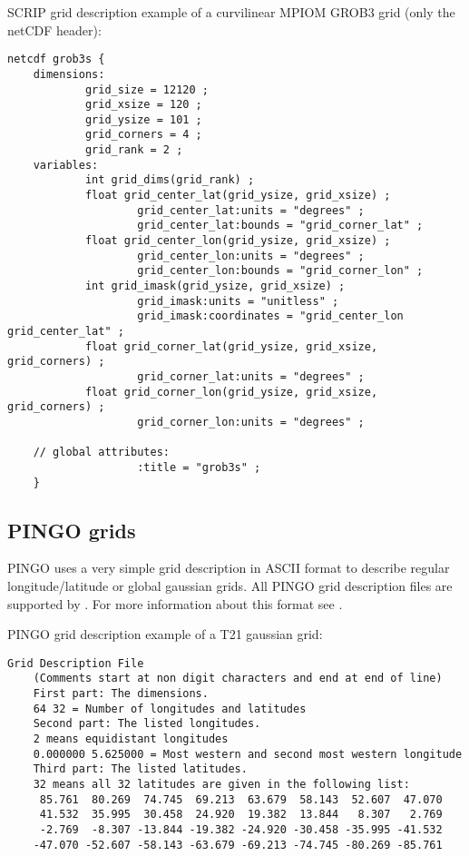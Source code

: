 SCRIP grid description example of a curvilinear MPIOM \cite{MPIOM} GROB3 grid (only the netCDF header):
\begin{lstlisting}[frame=single, backgroundcolor=\color{zebg}, basicstyle=\footnotesize]
    netcdf grob3s {
    dimensions:
            grid_size = 12120 ;
            grid_xsize = 120 ;
            grid_ysize = 101 ;
            grid_corners = 4 ;
            grid_rank = 2 ;
    variables:
            int grid_dims(grid_rank) ;
            float grid_center_lat(grid_ysize, grid_xsize) ;
                    grid_center_lat:units = "degrees" ;
                    grid_center_lat:bounds = "grid_corner_lat" ;
            float grid_center_lon(grid_ysize, grid_xsize) ;
                    grid_center_lon:units = "degrees" ;
                    grid_center_lon:bounds = "grid_corner_lon" ;
            int grid_imask(grid_ysize, grid_xsize) ;
                    grid_imask:units = "unitless" ;
                    grid_imask:coordinates = "grid_center_lon grid_center_lat" ;
            float grid_corner_lat(grid_ysize, grid_xsize, grid_corners) ;
                    grid_corner_lat:units = "degrees" ;
            float grid_corner_lon(grid_ysize, grid_xsize, grid_corners) ;
                    grid_corner_lon:units = "degrees" ;

    // global attributes:
                    :title = "grob3s" ;
    }
\end{lstlisting}

\subsection{PINGO grids}

PINGO uses a very simple grid description in ASCII format
to describe regular longitude/latitude or global gaussian grids.
All PINGO grid description files are supported by {\CDO}. 
For more information about this format see \cite{PINGO}.

\vspace{2mm}

PINGO grid description example of a T21 gaussian grid:
\begin{lstlisting}[frame=single, backgroundcolor=\color{zebg}, basicstyle=\footnotesize]
    Grid Description File
    (Comments start at non digit characters and end at end of line)
    First part: The dimensions.
    64 32 = Number of longitudes and latitudes
    Second part: The listed longitudes.
    2 means equidistant longitudes
    0.000000 5.625000 = Most western and second most western longitude
    Third part: The listed latitudes.
    32 means all 32 latitudes are given in the following list:
     85.761  80.269  74.745  69.213  63.679  58.143  52.607  47.070
     41.532  35.995  30.458  24.920  19.382  13.844   8.307   2.769
     -2.769  -8.307 -13.844 -19.382 -24.920 -30.458 -35.995 -41.532
    -47.070 -52.607 -58.143 -63.679 -69.213 -74.745 -80.269 -85.761
\end{lstlisting}

